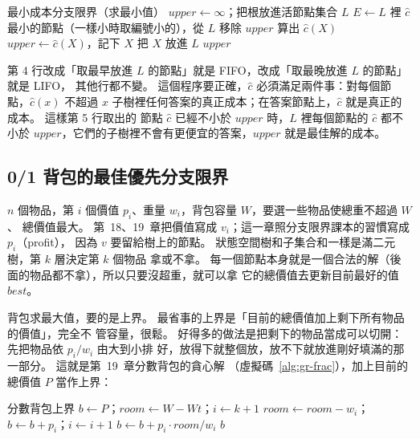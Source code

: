 \begin{pseudo}[label=alg:bk-lc]{最小成本分支限界（求最小值）}
    \State $\mathit{upper} \gets \infty$；把根放進活節點集合 $L$
        \State $E \gets L$ 裡 $\hat c$ 最小的節點（一樣小時取編號小的），從 $L$ 移除
            \State \Return $\mathit{upper}$ 
        \EndIf
            \State 算出 $\hat c(X)$
                    \State $\mathit{upper} \gets \hat c(X)$，記下 $X$
                \EndIf
                \State 把 $X$ 放進 $L$
            \EndIf
        \EndFor
    \EndWhile
    \State \Return $\mathit{upper}$
\EndFunction
\end{pseudo}

第 4 行改成「取最早放進 $L$ 的節點」就是 FIFO，改成「取最晚放進 $L$ 的節點」就是 LIFO，
其他行都不變。 這個程序要正確，$\hat c$ 必須滿足兩件事：對每個節點，$\hat c(x)$ 不超過
$x$ 子樹裡任何答案的真正成本；在答案節點上，$\hat c$ 就是真正的成本。 這樣第 5 行取出的
節點 $\hat c$ 已經不小於 $\mathit{upper}$ 時，$L$ 裡每個節點的 $\hat c$ 都不小於
$\mathit{upper}$，它們的子樹裡不會有更便宜的答案，$\mathit{upper}$ 就是最佳解的成本。

\subsection{0/1 背包的最佳優先分支限界}
\label{sec:bk-knap}

$n$ 個物品，第 $i$ 個價值 $p_i$、重量 $w_i$，背包容量 $W$，要選一些物品使總重不超過 $W$、
總價值最大。 第~18、19~章把價值寫成 $v_i$；這一章照分支限界課本的習慣寫成 $p_i$（profit），
因為 $v$ 要留給樹上的節點。 狀態空間樹和子集合和一樣是滿二元樹，第 $k$ 層決定第 $k$ 個物品
拿或不拿。 每一個節點本身就是一個合法的解（後面的物品都不拿），所以只要沒超重，就可以拿
它的總價值去更新目前最好的值 $\mathit{best}$。

背包求最大值，要的是上界。 最省事的上界是「目前的總價值加上剩下所有物品的價值」，完全不
管容量，很鬆。 好得多的做法是把剩下的物品當成可以切開：先把物品依 $p_i / w_i$ 由大到小排
好，放得下就整個放，放不下就放進剛好填滿的那一部分。 這就是第~19~章分數背包的貪心解
（虛擬碼~\ref{alg:gr-frac}），加上目前的總價值 $P$ 當作上界：

\begin{pseudo}[label=alg:bk-bound, unbreakable]{分數背包上界}
 
    \State $b \gets P$；$\mathit{room} \gets W - \mathit{Wt}$；$i \gets k + 1$
        \State $\mathit{room} \gets \mathit{room} - w_i$；$b \gets b + p_i$；$i \gets i + 1$
    \EndWhile
        \State $b \gets b + p_i \cdot \mathit{room} / w_i$ 
    \EndIf
    \State \Return $b$
\EndFunction
\end{pseudo}

